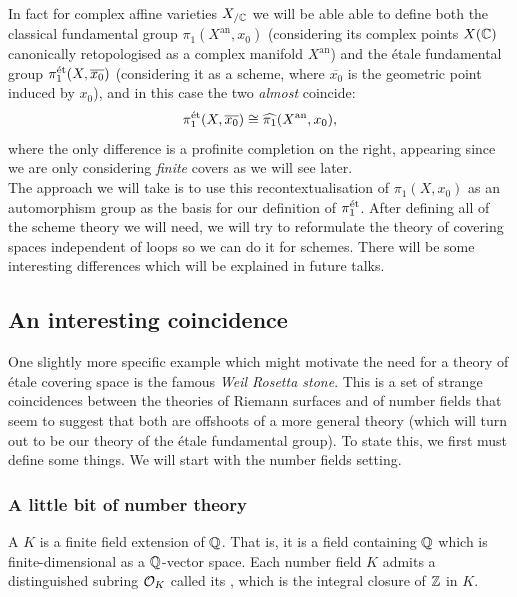 \leavevmode\\

In fact for complex affine varieties $X_{/ \mathbb{C}}$ we will be able able to define both the classical fundamental group $\pi_1(X^\mathrm{an}, x_0)$ (considering its complex points $X(\mathbb{C})$ canonically retopologised as a complex manifold $X^\mathrm{an}$) and the \'etale fundamental group $\pi_1^{\mathrm{\acute{e}t}}(X, \overline{x_0})$ (considering it as a scheme, where $\overline{x_0}$ is the geometric point induced by $x_0$), and in this case the two \emph{almost} coincide:
\[
	\pi_1^{\mathrm{\acute{e}t}}(X, \overline{x_0}) \cong \widehat{\pi_1}(X^\mathrm{an}, x_0),
\]
where the only difference is a profinite completion on the right, appearing since we are only considering \emph{finite} covers as we will see later. \\

The approach we will take is to use this recontextualisation of $\pi_1(X, x_0)$ as an automorphism group as the basis for our definition of $\pi_1^{\mathrm{\acute{e}t}}$. After defining all of the scheme theory we will need, we will try to reformulate the theory of covering spaces independent of loops so we can do it for schemes. There will be some interesting differences which will be explained in future talks.

\subsection{An interesting coincidence}
\label{subsec:1_2_Weil_rosetta_stone}
One slightly more specific example which might motivate the need for a theory of \'etale covering space is the famous \emph{Weil Rosetta stone}. This is a set of strange coincidences between the theories of Riemann surfaces and of number fields that seem to suggest that both are offshoots of a more general theory (which will turn out to be our theory of the \'etale fundamental group). To state this, we first must define some things. We will start with the number fields setting.

\subsubsection{A little bit of number theory}
\label{subsubsec:1_2_1_number_fields}
\begin{defn}
	A  $K$ is a finite field extension of $\mathbb{Q}$. That is, it is a field containing $\mathbb{Q}$ which is finite-dimensional as a $\mathbb{Q}$-vector space. Each number field $K$ admits a distinguished subring $\mathcal{O}_K$ called its , which is the integral closure of $\mathbb{Z}$ in $K$.
\end{defn}

